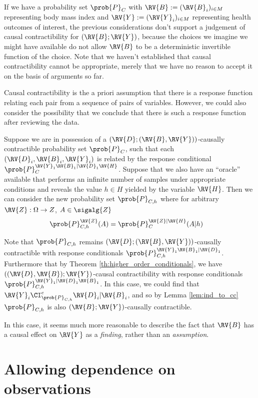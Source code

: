 If we have a probability set $\prob{P}_C$ with $\RV{B}:=(\RV{B}_i)_{i\in M}$ representing body mass index and $\RV{Y}:=(\RV{Y}_i)_{i\in M}$ representing health outcomes of interest, the previous considerations don't support a judgement of causal contractibility for $(\RV{B};\RV{Y})$, because the choices we imagine we might have available do not allow $\RV{B}$ to be a deterministic invertible function of the choice. Note that we haven't established that causal contractibility cannot be appropriate, merely that we have no reason to accept it on the basis of arguments so far.

Causal contractibility is the a priori assumption that there is a response function relating each pair from a sequence of pairs of variables. However, we could also consider the possibility that we conclude that there is such a response function after reviewing the data.

Suppose we are in possession of a $(\RV{D};(\RV{B},\RV{Y}))$-causally contractible probability set $\prob{P}_C$, such that each $(\RV{D}_i,\RV{B}_i,\RV{Y}_i)$ is related by the response conditional $\prob{P}_C^{\RV{Y}_1\RV{B}_1|\RV{D}_1\RV{H}}$. Suppose that we also have an ``oracle'' available that performs an infinite number of samples under appropriate conditions and reveals the value $h\in H$ yielded by the variable $\RV{H}$. Then we can consider the new probability set $\prob{P}_{C,h}$ where for arbitrary $\RV{Z}:\Omega\to Z$, $A\in \sigalg{Z}$
\begin{align}
    \prob{P}_{C,h}^{\RV{Z}}(A) &= \prob{P}_C^{\RV{Z}|\RV{H}}(A|h)
\end{align}

Note that $\prob{P}_{C,h}$ remains $(\RV{D};(\RV{B},\RV{Y}))$-causally contractible with response conditionals $\prob{P}_{C,h}^{\RV{Y}_1\RV{B}_1|\RV{D}_1}$. Furthermore that by Theorem \ref{th:higher_order_conditionals}, we have $((\RV{D},\RV{B});\RV{Y})$-causal contractibility with response conditionals $\prob{P}_{C,h}^{\RV{Y}_1|\RV{D}_1\RV{B}_1}$. In this case, we could find that $\RV{Y}_i\CI_{\prob{P}_{C,h}}^e \RV{D}_i|\RV{B}_i$, and so by Lemma \ref{lem:ind_to_cc} $\prob{P}_{C,h}$ is also $(\RV{B};\RV{Y})$-causally contractible.

In this case, it seems much more reasonable to describe the fact that $\RV{B}$ has a causal effect on $\RV{Y}$ as a \emph{finding}, rather than an \emph{assumption}. 

\section{Allowing dependence on observations}

